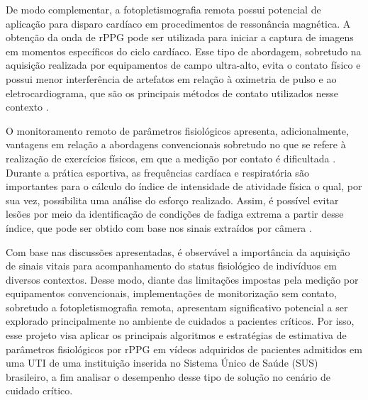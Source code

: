 De modo complementar, a fotopletismografia remota possui potencial de aplicação para disparo cardíaco em procedimentos de ressonância magnética. A obtenção da onda de rPPG pode ser utilizada para iniciar a captura de imagens em momentos específicos do ciclo cardíaco. Esse tipo de abordagem, sobretudo na aquisição realizada por equipamentos de campo ultra-alto, evita o contato físico e possui menor interferência de artefatos em relação à oximetria de pulso e ao eletrocardiograma, que são os principais métodos de contato utilizados nesse contexto \cite{spicher2016initial}. 

O monitoramento remoto de parâmetros fisiológicos apresenta, adicionalmente, vantagens em relação a abordagens convencionais sobretudo no que se refere à realização de exercícios físicos, em que a medição por contato é dificultada \cite{napolean2022heart}. Durante a prática esportiva, as frequências cardíaca e respiratória são importantes para o cálculo do índice de intensidade de atividade física o qual, por sua vez, possibilita uma análise do esforço realizado. Assim, é possível evitar lesões por meio da identificação de condições de fadiga extrema a partir desse índice, que pode ser obtido com base nos sinais extraídos por câmera \cite{wu2023motion}. 

Com base nas discussões apresentadas, é observável a importância da aquisição de sinais vitais para acompanhamento do status fisiológico de indivíduos em diversos contextos. Desse modo, diante das limitações impostas pela medição por equipamentos convencionais, implementações de monitorização sem contato, sobretudo a fotopletismografia remota, apresentam significativo potencial a ser explorado principalmente no ambiente de cuidados a pacientes críticos. Por isso, esse projeto visa aplicar os principais algoritmos e estratégias de estimativa de parâmetros fisiológicos por rPPG em vídeos adquiridos de pacientes admitidos em uma UTI de uma instituição inserida no Sistema Único de Saúde (SUS) brasileiro, a fim analisar o desempenho desse tipo de solução no cenário de cuidado crítico.

